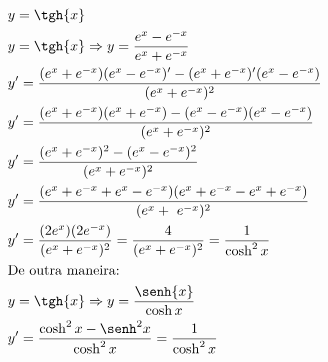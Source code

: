 \begin{ex}
\begin{align}
&y=\tgh{x}\nonumber\\
&y=\tgh{x} \Rightarrow y=\frac{e^{x}-e^{-x}}{e^{x}+e^{-x}}\nonumber\\
&y'=\frac{(e^{x}+e^{-x})(e^{x}-e^{-x})'-(e^{x}+e^{-x})'(e^{x}-e^{-x})}{(e^{x}+e^{-x})^2}\nonumber\\
&y'=\frac{(e^{x}+e^{-x})(e^{x}+e^{-x})-(e^{x}-e^{-x})(e^{x}-e^{-x})}{(e^{x}+e^{-x})^2}\nonumber\\
&y'=\frac{(e^{x}+e^{-x})^2-(e^{x}-e^{-x})^2}{(e^{x}+e^{-x})^2}\nonumber\\
&y'=\frac{(e^{x}+e^{-x}+e^{x}-e^{-x})(e^{x}+e^{-x}-e^{x}+e^{-x})}{(e^{x}+~e^{-x})^2}\nonumber\\
&y'=\frac{(2e^{x})(2e^{-x})}{(e^{x}+e^{-x})^2}=\frac{4}{(e^{x}+e^{-x})^2}=\frac{1}{\cosh^2{x}}\nonumber\\
&\text{De outra maneira:}\nonumber\\
&y=\tgh{x} \Rightarrow y=\frac{\senh{x}}{\cosh{x}}\nonumber\\
&y'=\frac{\cosh^2{x}-\senh^2{x}}{\cosh^2{x}}=\frac{1}{\cosh^2{x}}\nonumber
\end{align}
\end{ex}
